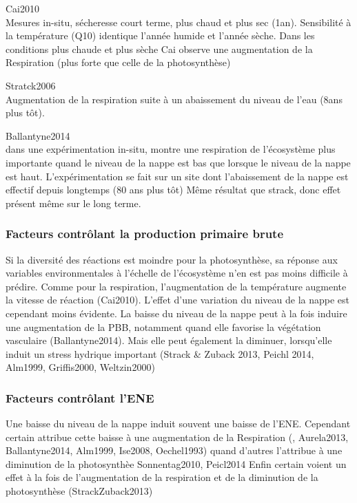 Cai2010\\
Mesures in-situ, sécheresse court terme, plus chaud et plus sec (1an).
Sensibilité à la température (Q10) identique l'année humide et l'année sèche.
Dans les conditions plus chaude et plus sèche Cai observe une augmentation de la Respiration (plus forte que celle de la photosynthèse)

Stratck2006 \\
Augmentation de la respiration suite à un abaissement du niveau de l'eau (8ans plus tôt).

Ballantyne2014 \\
dans une expérimentation in-situ, montre une respiration de l'écosystème plus importante quand le niveau de la nappe est bas que lorsque le niveau de la nappe est haut.
L'expérimentation se fait sur un site dont l'abaissement de la nappe est effectif depuis longtemps (80 ans plus tôt)
Même résultat que strack, donc effet présent même sur le long terme.

\subsubsection{Facteurs contrôlant la production primaire brute}
Si la diversité des réactions est moindre pour la photosynthèse, sa réponse aux variables environmentales à l'échelle de l'écosystème n'en est pas moins difficile à prédire.
Comme pour la respiration, l'augmentation de la température augmente la vitesse de réaction (Cai2010).
\plop
L'effet d'une variation du niveau de la nappe est cependant moins évidente.
La baisse du niveau de la nappe peut à la fois induire une augmentation de la PBB, notamment quand elle favorise la végétation vasculaire (Ballantyne2014).
Mais elle peut également la diminuer, lorsqu'elle induit un stress hydrique important (Strack \& Zuback 2013, Peichl 2014, Alm1999, Griffis2000, Weltzin2000)

\subsubsection{Facteurs contrôlant l'ENE}
Une baisse du niveau de la nappe induit souvent une baisse de l'ENE.
Cependant certain attribue cette baisse à une augmentation de la Respiration (, Aurela2013, Ballantyne2014, Alm1999, Ise2008, Oechel1993) quand d'autres l'attribue à une diminution de la photosynthèe Sonnentag2010, Peicl2014 
Enfin certain voient un effet à la fois de l'augmentation de la respiration et de la diminution de la photosynthèse (StrackZuback2013)

